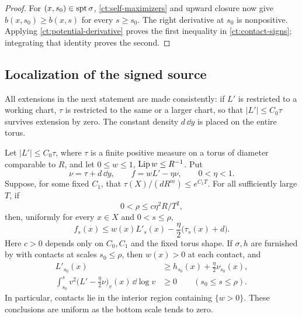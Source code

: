 \begin{proof}
For $(x,s_0)\in\operatorname{spt}\sigma$, \eqref{ct:self-maximizers} and upward
closure now give $b(x,s_0)\ge b(x,s)$ for every $s\ge s_0$.
The right derivative at $s_0$ is nonpositive.  Applying
\eqref{ct:potential-derivative} proves the first inequality in
\eqref{ct:contact-signs}; integrating that identity proves the second.
\end{proof}



\subsection{Localization of the signed source}

All extensions in the next statement are made consistently: if $L'$ is
restricted to a working chart, $\tau$ is restricted to the same or a
larger chart, so that $|L'|\le C_0\tau$ survives extension by zero.
The constant density $d\,\dd y$ is placed on the entire torus.

\begin{lemma}\label{ct:localization}
Let $|L'|\le C_0\tau$, where $\tau$ is a finite positive measure on a
torus of diameter comparable to $R$, and let
$0\le w\le1$, $\operatorname{Lip} w\le R^{-1}$.  Put
\[
 \nu=\tau+d\,\dd y,\qquad f=wL'-\eta\nu,
 \qquad 0<\eta<1.
\]
Suppose, for some fixed $C_1$, that
$\tau(X)/(dR^m)\le e^{C_1T}$.  For all sufficiently large $T$, if
\begin{equation}\label{ct:localization-scale}
 0<\rho\le c\eta^2R/T^2,
\end{equation}
then, uniformly for every $x\in X$ and $0<s\le\rho$,
\begin{equation}\label{ct:localized-source}
 f_s(x)\le w(x)L'_s(x)-\frac\eta2\bigl(\tau_s(x)+d\bigr).
\end{equation}
Here $c>0$ depends only on $C_0,C_1$ and the fixed torus shape.
If $\sigma,h$ are furnished by  with contacts at
scales $s_0\le\rho$, then $w(x)>0$ at each contact, and
\begin{align}
 L'_{s_0}(x)&\ge h_{s_0}(x)+\tfrac\eta2\nu_{s_0}(x),
 \label{ct:localized-initial}\\
 \int_{s_0}^s v^2\bigl(L'-\tfrac\eta2\nu\bigr)_v(x)
 \,\dd\log v&\ge0\qquad(s_0\le s\le\rho).
 \label{ct:localized-cumulative}
\end{align}
In particular, contacts lie in the interior region containing
$\{w>0\}$.  These conclusions are uniform as the bottom scale tends to
zero.
\end{lemma}

